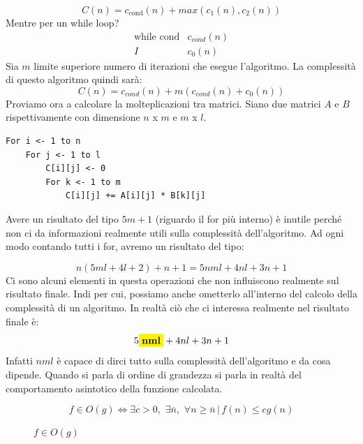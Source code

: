 \documentclass[a4paper]{article}
\begin{document}
\[C(n) = c_{\text{cond}}(n) + max(c_1(n), c_2(n))\]
Mentre per un while loop?
\[\begin{matrix}
    \text{while cond} & c_{cond}(n)\\
    I & c_0(n)
\end{matrix}\]
Sia $m$ limite superiore numero di iterazioni che esegue l'algoritmo. La complessità di questo algoritmo quindi sarà:
\[C(n) = c_{cond}(n) + m(c_{cond}(n) + c_0(n))\]
Proviamo ora a calcolare la molteplicazioni tra matrici.
Siano due matrici $A$ e $B$ rispettivamente con dimensione $n$ x $m$ e $m$ x $l$.
\begin{lstlisting}
For i <- 1 to n
    For j <- 1 to l
        C[i][j] <- 0
        For k <- 1 to m
            C[i][j] += A[i][j] * B[k][j]
\end{lstlisting}
Avere un risultato del tipo $5m + 1$ (riguardo il for più interno) è inutile perché non ci da informazioni realmente utili sulla complessità dell'algoritmo.
Ad ogni modo contando tutti i for, avremo un risultato del tipo:

\[n(5ml + 4l + 2) + n + 1 = 5nml + 4nl + 3n + 1\]
Ci sono alcuni elementi in questa operazioni che non influiscono realmente sul risultato finale. Indi per cui, possiamo anche ometterlo all'interno del calcolo della complessità di un algoritmo.
In realtà ciò che ci interessa realmente nel risultato finale è:
\[5\colorbox{yellow}{\textbf{nml}}+ 4nl + 3n + 1\]
Infatti $nml$ è capace di dirci tutto sulla complessità dell'algoritmo e da cosa dipende.
Quando si parla di ordine di grandezza si parla in realtà del comportamento asintotico della funzione calcolata.
\begin{definition}
\[f \in O(g)  \Longleftrightarrow \exists c > 0, \,\, \exists \overline{n}, \,\, \forall n \ge \overline{n} \, | \, f(n) \le cg(n)\]
\end{definition}
\begin{figure}[H]
    \centering
    \caption{$f \in O(g)$}
\end{figure}
\end{document}

